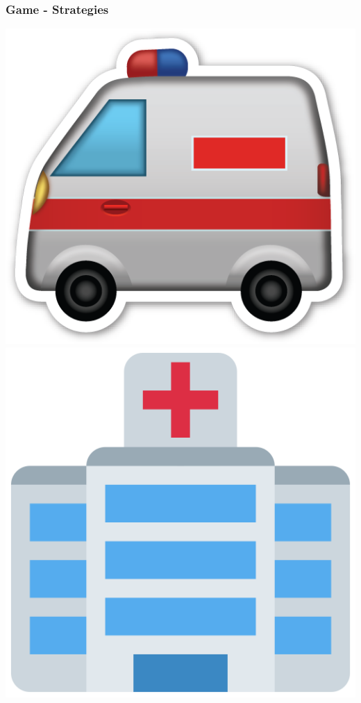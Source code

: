 \begin{frame}
    \frametitle{Game - Strategies}
    \centering

    \includegraphics[scale=0.1]{Bin/ambulance_cartoon.png}
    \hspace{2cm}
    \includegraphics[scale=0.1]{Bin/hospital.png}

\end{frame}
